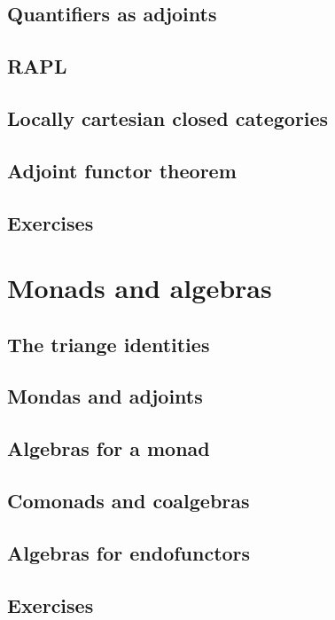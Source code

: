\documentclass[uplatex, 12pt, dvipdfmx]{jsarticle}
\begin{document}
\subsection{Quantifiers as adjoints}

\subsection{RAPL}

\subsection{Locally cartesian closed categories}

\subsection{Adjoint functor theorem}

\subsection{Exercises}

\section{Monads and algebras}

\subsection{The triange identities}

\subsection{Mondas and adjoints}

\subsection{Algebras for a monad}

\subsection{Comonads and coalgebras}

\subsection{Algebras for endofunctors}

\subsection{Exercises}
\end{document}
